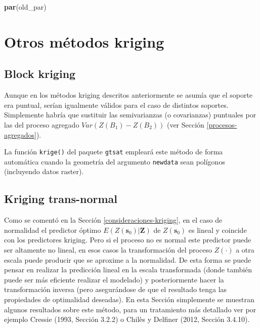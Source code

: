 \documentclass[
]{book}
\newenvironment{Shaded}{\begin{snugshade}}{\end{snugshade}}
\newcommand{\FunctionTok}[1]{\textcolor[rgb]{0.13,0.29,0.53}{\textbf{#1}}}
\newcommand{\NormalTok}[1]{#1}
\theoremstyle{break}
\theoremstyle{definition}
\theoremstyle{definition}
\theoremstyle{definition}
\theoremstyle{definition}
\theoremstyle{remark}
\begin{document}
\begin{Shaded}
\begin{Highlighting}[]
\FunctionTok{par}\NormalTok{(old\_par)}
\end{Highlighting}
\end{Shaded}

\section{Otros métodos kriging}\label{otros-muxe9todos-kriging}

\subsection{Block kriging}\label{block-kriging}

Aunque en los métodos kriging descritos anteriormente se asumía que el soporte era puntual, serían igualmente válidos para el caso de distintos soportes.
Simplemente habría que sustituir las semivarianzas (o covarianzas) puntuales por las del proceso agregado \(Var\left( Z(B_1)-Z(B_2)\right)\) (ver Sección \ref{procesos-agregados}).

La función \texttt{krige()} del paquete \texttt{gtsat} empleará este método de forma automática cuando la geometría del argumento \texttt{newdata} sean polígonos (incluyendo datos raster).

\subsection{Kriging trans-normal}\label{kriging-trans-normal}

Como se comentó en la Sección \ref{consideraciones-kriging}, en el caso de normalidad el predictor óptimo \(E\left( \left. Z(\mathbf{s}_{0})\right| \mathbf{Z}\right)\) de \(Z(\mathbf{s}_{0})\) es lineal y coincide con los predictores kriging.
Pero si el proceso no es normal este predictor puede ser altamente no lineal, en esos casos la transformación del proceso \(Z(\cdot)\) a otra escala puede producir que se aproxime a la normalidad.
De esta forma se puede pensar en realizar la predicción lineal en la escala transformada (donde también puede ser más eficiente realizar el modelado) y posteriormente hacer la transformación inversa (pero asegurándose de que el resultado tenga las propiedades de optimalidad deseadas).
En esta Sección simplemente se muestran algunos resultados sobre este método, para un tratamiento más detallado ver por ejemplo Cressie (1993, Sección 3.2.2) o Chilès y Delfiner (2012, Sección 3.4.10).
\end{document}
